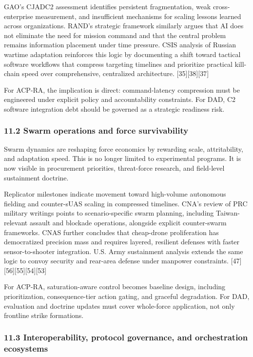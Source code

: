 \documentclass[11pt]{article}
\begin{document}
GAO's CJADC2 assessment identifies persistent fragmentation, weak
cross-enterprise measurement, and insufficient mechanisms for scaling
lessons learned across organizations. RAND's strategic framework
similarly argues that AI does not eliminate the need for mission command
and that the central problem remains information placement under time
pressure. CSIS analysis of Russian wartime adaptation reinforces this
logic by documenting a shift toward tactical software workflows that
compress targeting timelines and prioritize practical kill-chain speed
over comprehensive, centralized architecture. {[}35{]}{[}38{]}{[}37{]}

For ACP-RA, the implication is direct: command-latency compression must
be engineered under explicit policy and accountability constraints. For
DAD, C2 software integration debt should be governed as a strategic
readiness risk.

\hypertarget{swarm-operations-and-force-survivability}{%
\subsubsection{11.2 Swarm operations and force
survivability}\label{swarm-operations-and-force-survivability}}

Swarm dynamics are reshaping force economics by rewarding scale,
attritability, and adaptation speed. This is no longer limited to
experimental programs. It is now visible in procurement priorities,
threat-force research, and field-level sustainment doctrine.

Replicator milestones indicate movement toward high-volume autonomous
fielding and counter-sUAS scaling in compressed timelines. CNA's review
of PRC military writings points to scenario-specific swarm planning,
including Taiwan-relevant assault and blockade operations, alongside
explicit counter-swarm frameworks. CNAS further concludes that
cheap-drone proliferation has democratized precision mass and requires
layered, resilient defenses with faster sensor-to-shooter integration.
U.S. Army sustainment analysis extends the same logic to convoy security
and rear-area defense under manpower constraints.
{[}47{]}{[}56{]}{[}55{]}{[}54{]}{[}53{]}

For ACP-RA, saturation-aware control becomes baseline design, including
prioritization, consequence-tier action gating, and graceful
degradation. For DAD, evaluation and doctrine updates must cover
whole-force application, not only frontline strike formations.

\hypertarget{interoperability-protocol-governance-and-orchestration-ecosystems}{%
\subsubsection{11.3 Interoperability, protocol governance, and
orchestration
ecosystems}\label{interoperability-protocol-governance-and-orchestration-ecosystems}}
\end{document}
